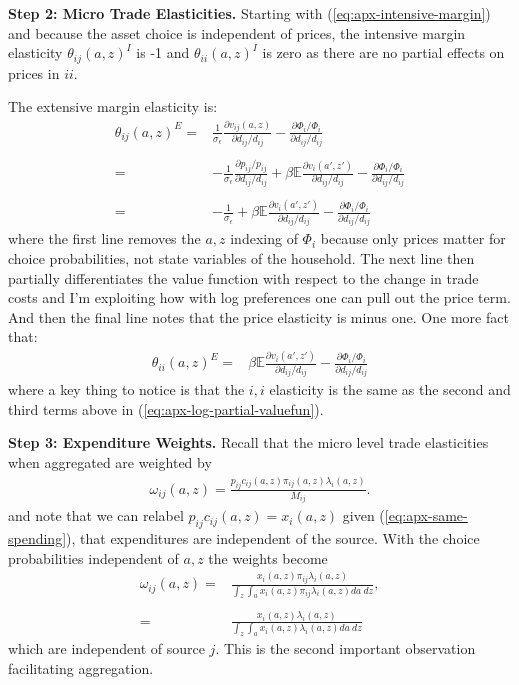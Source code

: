 \documentclass[12pt,pdftex]{article}
\begin{document}
\begin{onehalfspacing}
\textbf{Step 2: Micro Trade Elasticities.} Starting with (\ref{eq:apx-intensive-margin}) and because the asset choice is independent of prices, the intensive margin elasticity $\theta_{ij}(a,z)^I$ is -1 and $\theta_{ii}(a,z)^I$ is zero as there are no partial effects on prices in $ii$.

The extensive margin elasticity is:
\begin{align}
\theta_{ij}(a,z)^E =& \frac{1}{\sigma_{\epsilon}}\frac{\partial v_{ij}(a,z)}{\partial d_{ij}/d_{ij}} -  \frac{\partial \Phi_{i} / \Phi_{i}}{\partial d_{ij}/d_{ij}}\\
\nonumber \\
=& -\frac{1}{\sigma_{\epsilon}}\frac{\partial p_{ij} / p_{ij}}{\partial d_{ij}/d_{ij}} + \beta \mathbb{E} \frac{\partial v_{i}(a',z')}{\partial d_{ij}/d_{ij}} -  \frac{\partial \Phi_{i} / \Phi_{i}}{\partial d_{ij}/d_{ij}} \\
\nonumber \\
=& -\frac{1}{\sigma_{\epsilon}} + \beta \mathbb{E} \frac{\partial v_{i}(a',z')}{\partial d_{ij}/d_{ij}} -  \frac{\partial \Phi_{i} / \Phi_{i}}{\partial d_{ij}/d_{ij}}
\label{eq:apx-log-partial-valuefun}
\end{align}
where the first line removes the $a,z$ indexing of $\Phi_i$ because only prices matter for choice probabilities, not state variables of the household. The next line then partially differentiates the value function with respect to the change in trade costs and I'm exploiting how with log preferences one can pull out the price term. And then the final line notes that the price elasticity is minus one. One more fact that:
\begin{align}
\theta_{ii}(a,z)^E =&  \beta \mathbb{E} \frac{\partial v_{i}(a',z')}{\partial d_{ij}/d_{ij}} -  \frac{\partial \Phi_{i} / \Phi_{i}}{\partial d_{ij}/d_{ij}}
\end{align}
where a key thing to notice is that the $i,i$ elasticity is the same as the second and third terms above in (\ref{eq:apx-log-partial-valuefun}).


\textbf{Step 3: Expenditure Weights.} Recall that the micro level trade elasticities when aggregated are weighted by
\begin{align}
\omega_{ij}(a,z) = \frac{p_{ij}c_{ij}(a,z)\pi_{ij}(a,z) \lambda_{i}(a,z)}{M_{ij}}.
\end{align}
and note that we can relabel $p_{ij}c_{ij}(a,z) = x_{i}(a,z)$ given (\ref{eq:apx-same-spending}), that expenditures are independent of the source. With the choice probabilities independent of $a,z$ the weights become
\begin{align}
\omega_{ij}(a,z) =& \frac{x_{i}(a,z)\pi_{ij} \lambda_{i}(a,z)}{\int_{z}\int_{a}x_{i}(a,z)\pi_{ij} \lambda_{i}(a,z)da \ dz}, \\
\nonumber \\
=& \frac{x_{i}(a,z) \lambda_{i}(a,z)}{\int_{z}\int_{a} x_{i}(a,z) \lambda_{i}(a,z)da \ dz}
\end{align}
which are independent of source $j$. This is the second important observation facilitating aggregation.


\end{onehalfspacing}
\end{document}
